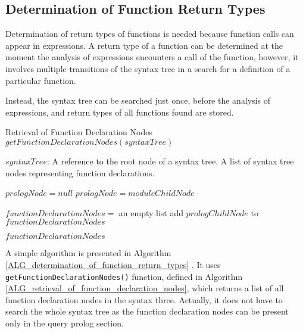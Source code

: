 
\subsection{Determination of Function Return Types}
Determination of return types of functions is needed because function calls can appear in expressions. A return type of a function can be determined at the moment the analysis of expressions encounters a call of the function, however, it involves multiple transitions of the syntax tree in a search for a definition of a particular function.

Instead, the syntax tree can be searched just once, before the analysis of expressions, and return types of all functions found are stored.

\begin{algorithm}
\caption{Retrieval of Function Declaration Nodes $getFunctionDeclarationNodes(syntaxTree)$}
\label{ALG_retrieval_of_function_declaration_nodes}
\begin{algorithmic}[1]
\REQUIRE $syntaxTree$: A reference to the root node of a syntax tree.
\ENSURE A list of syntax tree nodes representing function declarations.

\STATE $prologNode = null$
        \STATE $prologNode = moduleChildNode$
    \ENDIF
\ENDFOR

\STATE $functionDeclarationNodes =$ an empty list
            \STATE add $prologChildNode$ to $functionDeclarationNodes$
        \ENDIF
    \ENDFOR
\ENDIF

\RETURN $functionDeclarationNodes$
\end{algorithmic}
\end{algorithm}

A simple algorithm is presented in Algorithm \ref{ALG_determination_of_function_return_types} . It uses \texttt{getFunctionDeclarationNodes()} function, defined in Algorithm \ref{ALG_retrieval_of_function_declaration_nodes}, which returns a list of all function declaration nodes in the syntax three. Actually, it does not have to search the whole syntax tree as the function declaration nodes can be present only in the query prolog section. 

